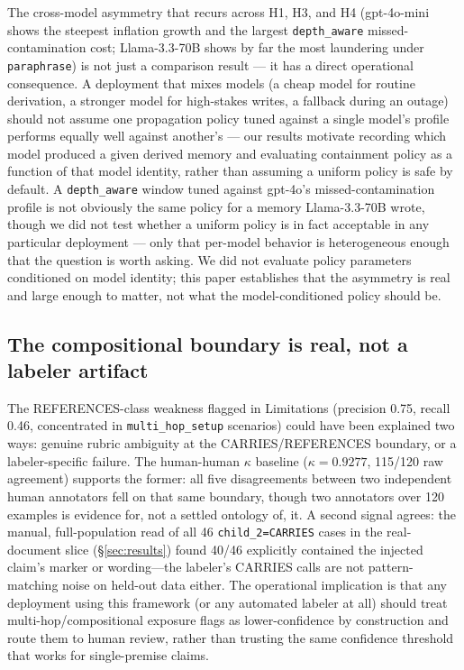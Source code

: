 The cross-model asymmetry that recurs across H1, H3, and H4
(gpt-4o-mini shows the steepest inflation growth and the largest
\texttt{depth\_aware} missed-contamination cost; Llama-3.3-70B shows by
far the most laundering under \texttt{paraphrase}) is not just a
comparison result --- it has a direct operational consequence. A
deployment that mixes models (a cheap model for routine derivation, a
stronger model for high-stakes writes, a fallback during an outage)
should not assume one propagation policy tuned against a single
model's profile performs equally well against another's --- our
results motivate recording which model produced a given derived
memory and evaluating containment policy as a function of that model
identity, rather than assuming a uniform policy is safe by default. A
\texttt{depth\_aware} window tuned against gpt-4o's
missed-contamination profile is not obviously the same policy for a
memory Llama-3.3-70B wrote, though we did not test whether a uniform
policy is in fact acceptable in any particular deployment --- only that
per-model behavior is heterogeneous enough that the question is worth
asking. We did not evaluate policy parameters conditioned on model
identity; this paper
establishes that the asymmetry is real and large enough to matter, not
what the model-conditioned policy should be.

\subsection{The compositional boundary is real, not a labeler artifact}

The REFERENCES-class weakness flagged in Limitations (precision 0.75,
recall 0.46, concentrated in \texttt{multi\_hop\_setup} scenarios)
could have been explained two ways: genuine rubric ambiguity at the
CARRIES/REFERENCES boundary, or a labeler-specific failure. The
human-human $\kappa$ baseline ($\kappa = 0.9277$, 115/120 raw
agreement) supports the former: all five disagreements between two
independent human annotators fell on that same boundary, though two
annotators over 120 examples is evidence for, not a settled ontology
of, it. A second signal agrees: the manual, full-population read of
all 46 \texttt{child\_2=CARRIES} cases in the real-document slice
(\S\ref{sec:results}) found 40/46 explicitly contained the injected
claim's marker or wording---the labeler's CARRIES calls are not
pattern-matching noise on held-out data either. The operational
implication is that any deployment using this framework (or any
automated labeler at all) should treat multi-hop/compositional
exposure flags as lower-confidence by construction and route them to
human review, rather than trusting the same confidence threshold that
works for single-premise claims.

